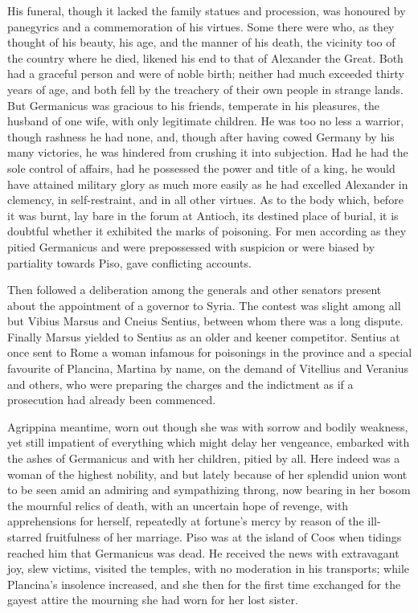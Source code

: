 
His funeral, though it lacked the family statues and procession, was honoured by panegyrics and a commemoration of his virtues. Some there were who, as they thought of his beauty, his age, and the manner of his death, the vicinity too of the country where he died, likened his end to that of Alexander the Great. Both had a graceful person and were of noble birth; neither had much exceeded thirty years of age, and both fell by the treachery of their own people in strange lands. But Germanicus was gracious to his friends, temperate in his pleasures, the husband of one wife, with only legitimate children. He was too no less a warrior, though rashness he had none, and, though after having cowed Germany by his many victories, he was hindered from crushing it into subjection. Had he had the sole control of affairs, had he possessed the power and title of a king, he would have attained military glory as much more easily as he had excelled Alexander in clemency, in self-restraint, and in all other virtues. As to the body which, before it was burnt, lay bare in the forum at Antioch, its destined place of burial, it is doubtful whether it exhibited the marks of poisoning. For men according as they pitied Germanicus and were prepossessed with suspicion or were biased by partiality towards Piso, gave conflicting accounts.


Then followed a deliberation among the generals and other senators present about the appointment of a governor to Syria. The contest was slight among all but Vibius Marsus and Cneius Sentius, between whom there was a long dispute. Finally Marsus yielded to Sentius as an older and keener competitor. Sentius at once sent to Rome a woman infamous for poisonings in the province and a special favourite of Plancina, Martina by name, on the demand of Vitellius and Veranius and others, who were preparing the charges and the indictment as if a prosecution had already been commenced.


Agrippina meantime, worn out though she was with sorrow and bodily weakness, yet still impatient of everything which might delay her vengeance, embarked with the ashes of Germanicus and with her children, pitied by all. Here indeed was a woman of the highest nobility, and but lately because of her splendid union wont to be seen amid an admiring and sympathizing throng, now bearing in her bosom the mournful relics of death, with an uncertain hope of revenge, with apprehensions for herself, repeatedly at fortune's mercy by reason of the ill-starred fruitfulness of her marriage. Piso was at the island of Coos when tidings reached him that Germanicus was dead. He received the news with extravagant joy, slew victims, visited the temples, with no moderation in his transports; while Plancina's insolence increased, and she then for the first time exchanged for the gayest attire the mourning she had worn for her lost sister.

